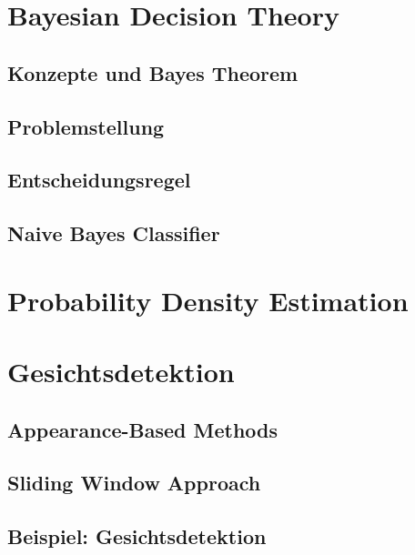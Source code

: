 \documentclass[a4paper, 11pt, accentcolor = tud3b]{tudreport}
\begin{document}
		\section{Bayesian Decision Theory} %

			\subsection{Konzepte und Bayes Theorem} %

			\subsection{Problemstellung} %

			\subsection{Entscheidungsregel} %

			\subsection{Naive Bayes Classifier} %

		\section{Probability Density Estimation} %

		\section{Gesichtsdetektion} %

			\subsection{Appearance-Based Methods} %

			\subsection{Sliding Window Approach} %

			\subsection{Beispiel: Gesichtsdetektion} %
\end{document}

